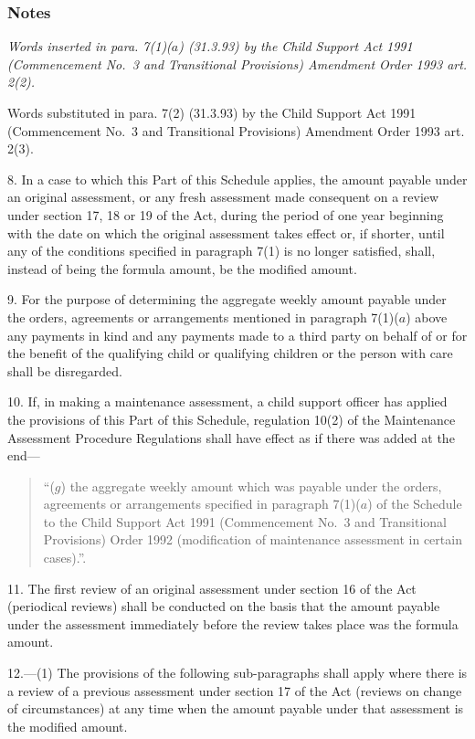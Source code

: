\documentclass[a4paper]{article}
\newcommand\amendment[1]{\subsubsection*{Notes}{\itshape\frenchspacing\footnotesize #1 \par}}
\begin{document}
\amendment{
Words inserted in para. 7(1)($a$) (31.3.93) by the Child Support Act 1991 (Commencement No.\ 3 and Transitional Provisions) Amendment Order 1993 art. 2(2).

Words substituted in para. 7(2) (31.3.93) by the Child Support Act 1991 (Commencement No.\ 3 and Transitional Provisions) Amendment Order 1993 art. 2(3). 
}

\medskip

8.  In a case to which this Part of this Schedule applies, the amount payable under an original assessment, or any fresh assessment made consequent on a review under section 17, 18 or 19 of the Act, during the period of one year beginning with the date on which the original assessment takes effect or, if shorter, until any of the conditions specified in paragraph 7(1) is no longer satisfied, shall, instead of being the formula amount, be the modified amount.

\medskip

9.  For the purpose of determining the aggregate weekly amount payable under the orders, agreements or arrangements mentioned in paragraph 7(1)($a$) above any payments in kind and any payments made to a third party on behalf of or for the benefit of the qualifying child or qualifying children or the person with care shall be disregarded.

\medskip

10.  If, in making a maintenance assessment, a child support officer has applied the provisions of this Part of this Schedule, regulation 10(2) of the Maintenance Assessment Procedure Regulations shall have effect as if there was added at the end—
\begin{quotation}
“($g$) the aggregate weekly amount which was payable under the orders, agreements or arrangements specified in paragraph 7(1)($a$) of the Schedule to the Child Support Act 1991 (Commencement No.\ 3 and Transitional Provisions) Order 1992 (modification of maintenance assessment in certain cases).”.
\end{quotation}

\medskip

11.  The first review of an original assessment under section 16 of the Act (periodical reviews) shall be conducted on the basis that the amount payable under the assessment immediately before the review takes place was the formula amount.

\medskip

12.—(1) The provisions of the following sub-paragraphs shall apply where there is a review of a previous assessment under section 17 of the Act (reviews on change of circumstances) at any time when the amount payable under that assessment is the modified amount.
\end{document}
